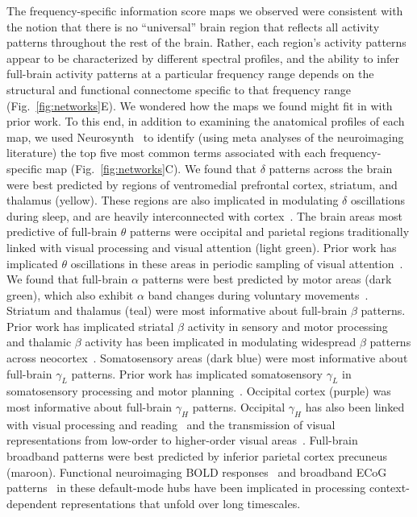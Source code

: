 \documentclass[11pt]{article}
\begin{document}
The frequency-specific information score maps we observed were consistent with
the notion that there is no ``universal'' brain region that  reflects all
activity patterns throughout the rest of the brain.  Rather, each region's
activity patterns appear to be characterized by different spectral profiles, and
the ability to infer full-brain activity patterns at a particular frequency
range depends on the structural and functional connectome specific to that
frequency range (Fig.~\ref{fig:networks}E).  We wondered how the maps we found
might fit in with prior work.  To this end, in addition to examining the
anatomical profiles of each map, we used Neurosynth~\citep{RubiEtal17} to
identify (using meta analyses of the neuroimaging literature) the top five most
common terms associated with each frequency-specific map
(Fig.~\ref{fig:networks}C).  We found that $\delta$ patterns across the brain
were best predicted by regions of ventromedial prefrontal cortex, striatum, and
thalamus (yellow).  These regions are also implicated in modulating $\delta$
oscillations during sleep, and are heavily interconnected with
cortex~\citep[e.g.,][]{AmziSter98}.  The brain areas most predictive of
full-brain $\theta$ patterns were occipital and parietal regions traditionally
linked with visual processing and visual attention (light green). Prior work has
implicated $\theta$ oscillations in these areas in periodic sampling of visual
attention~\citep[e.g.,][]{BuscVanR10}.  We found that full-brain $\alpha$
patterns were best predicted by motor areas (dark green), which also exhibit
$\alpha$ band changes during voluntary movements~\citep[e.g.,][]{JurkEtal06}.
Striatum and thalamus (teal) were most informative about full-brain $\beta$
patterns.  Prior work has implicated striatal $\beta$ activity in sensory and
motor processing~\citep{FeinEtal15} and thalamic $\beta$ activity has been
implicated in modulating widespread $\beta$ patterns across
neocortex~\citep{SherEtal16}. Somatosensory areas (dark blue) were most
informative about full-brain $\gamma_L$ patterns. Prior work has implicated
somatosensory $\gamma_L$ in somatosensory processing and motor
planning~\citep{IharEtal03}.  Occipital cortex (purple) was most informative
about full-brain $\gamma_H$ patterns.  Occipital $\gamma_H$ has also been linked
with visual processing and reading~\citep{WuEtal11} and the transmission of
visual representations from low-order to higher-order visual
areas~\citep{MatsEtal13}.  Full-brain broadband patterns were best predicted by
inferior parietal cortex precuneus (maroon).  Functional neuroimaging BOLD
responses~\citep{SimoEtal16} and broadband ECoG patterns~\citep{HoneEtal12a} in
these default-mode hubs have been implicated in processing context-dependent
representations that unfold over long timescales.
\end{document}
